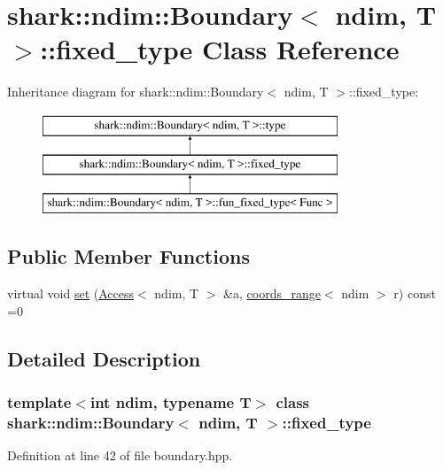 \hypertarget{classshark_1_1ndim_1_1_boundary_1_1fixed__type}{}\section{shark\+:\+:ndim\+:\+:Boundary$<$ ndim, T $>$\+:\+:fixed\+\_\+type Class Reference}
\label{classshark_1_1ndim_1_1_boundary_1_1fixed__type}
Inheritance diagram for shark\+:\+:ndim\+:\+:Boundary$<$ ndim, T $>$\+:\+:fixed\+\_\+type\+:\begin{figure}[H]
\begin{center}
\leavevmode
\includegraphics[height=3.000000cm]{classshark_1_1ndim_1_1_boundary_1_1fixed__type}
\end{center}
\end{figure}
\subsection*{Public Member Functions}
\begin{DoxyCompactItemize}
\item 
virtual void \hyperlink{classshark_1_1ndim_1_1_boundary_1_1fixed__type_ad94ec2994049c5107d0ea5d24bf8cff3}{set} (\hyperlink{classshark_1_1ndim_1_1_access}{Access}$<$ ndim, T $>$ \&a, \hyperlink{structshark_1_1ndim_1_1coords__range}{coords\+\_\+range}$<$ ndim $>$ r) const =0
\end{DoxyCompactItemize}


\subsection{Detailed Description}
\subsubsection*{template$<$int ndim, typename T$>$\newline
class shark\+::ndim\+::\+Boundary$<$ ndim, T $>$\+::fixed\+\_\+type}



Definition at line 42 of file boundary.\+hpp.



